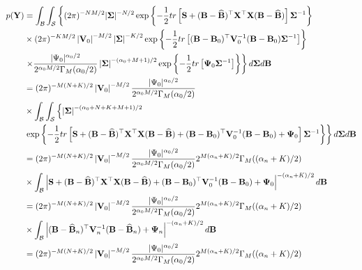 \begin{align*}
	p({\bf{Y}})&=\int_{\mathcal{B}}\int_{\mathcal{S}}\left\{ (2\pi)^{-NM/2} |{{\bf \Sigma}}|^{-N/2}\exp\left\lbrace -\frac{1}{2}tr\left[{\bf{S}}+({\bf{B}}-\widehat{\bf{B}})^{\top}{\bf{X}}^{\top}{\bf{X}}({\bf{B}}-\widehat{\bf{B}})\right]{{\bf \Sigma}}^{-1}\right\rbrace\right.\\
	&\times (2\pi)^{-KM/2}\left|{\bf V}_0 \right|^{-M/2} \left|{\bf\Sigma} \right|^{-K/2}\exp\left\lbrace -\frac{1}{2}tr\left[({\bf{B}}-{\bf{B}}_{0})^{\top}{\bf{V}}_{0}^{-1}({\bf{B}}-{\bf{B}}_{0}){\bf \Sigma}^{-1}\right]\right\rbrace \\
	&\left. \times \frac{|\Psi_0|^{\alpha_0/2}}{2^{\alpha_0M/2}\Gamma_M(\alpha_0/2)} \left|{\bf \Sigma} \right|^{-(\alpha_{0}+M+1)/2}\exp\left\lbrace -\frac{1}{2}tr \left[ {\bf{\Psi}}_{0} {\bf \Sigma}^{-1}\right] \right\rbrace \right\} d{\bf\Sigma} d{\bf B}\\
	&=(2\pi)^{-M(N+K)/2}\left|{\bf V}_0\right|^{-M/2}\frac{|\Psi_0|^{\alpha_0/2}}{2^{\alpha_0M/2}\Gamma_M(\alpha_0/2)}\\
	&\times\int_{\mathcal{B}}\int_{\mathcal{S}} \left\{ \left|{\bf \Sigma} \right|^{-(\alpha_{0}+N+K+M+1)/2}\right.\\
	&\left. \exp\left\lbrace -\frac{1}{2}tr\left[{\bf{S}}+({\bf{B}}-\widehat{\bf{B}})^{\top}{\bf{X}}^{\top}{\bf{X}}({\bf{B}}-\widehat{\bf{B}})+({\bf{B}}-{\bf{B}}_{0})^{\top}{\bf{V}}_{0}^{-1}({\bf{B}}-{\bf{B}}_{0})+{\bf{\Psi}}_0\right]{{\bf \Sigma}}^{-1}\right\rbrace\right\}d{\bf\Sigma} d{\bf B}\\
	&=(2\pi)^{-M(N+K)/2}\left|{\bf V}_0\right|^{-M/2}\frac{|\Psi_0|^{\alpha_0/2}}{2^{\alpha_0M/2}\Gamma_M(\alpha_0/2)}2^{M(\alpha_n+K)/2}\Gamma_M((\alpha_n+K)/2)\\
	&\times \int_{\mathcal{B}}\left|{\bf{S}}+({\bf{B}}-\widehat{\bf{B}})^{\top}{\bf{X}}^{\top}{\bf{X}}({\bf{B}}-\widehat{\bf{B}})+({\bf{B}}-{\bf{B}}_{0})^{\top}{\bf{V}}_{0}^{-1}({\bf{B}}-{\bf{B}}_{0})+{\bf{\Psi}}_0\right|^{-(\alpha_n+K)/2}d{\bf{B}}\\
	&=(2\pi)^{-M(N+K)/2}\left|{\bf V}_0\right|^{-M/2}\frac{|\Psi_0|^{\alpha_0/2}}{2^{\alpha_0M/2}\Gamma_M(\alpha_0/2)}2^{M(\alpha_n+K)/2}\Gamma_M((\alpha_n+K)/2)\\
	&\times \int_{\mathcal{B}}\left|({\bf{B}}-\widehat{\bf{B}}_n)^{\top}{\bf{V}}_n^{-1}({\bf{B}}-\widehat{\bf{B}}_n)+{\bf{\Psi}}_n\right|^{-(\alpha_n+K)/2}d{\bf{B}}\\ 
	&=(2\pi)^{-M(N+K)/2}\left|{\bf V}_0\right|^{-M/2}\frac{|\Psi_0|^{\alpha_0/2}}{2^{\alpha_0M/2}\Gamma_M(\alpha_0/2)}2^{M(\alpha_n+K)/2}\Gamma_M((\alpha_n+K)/2)\\

\end{align*}
